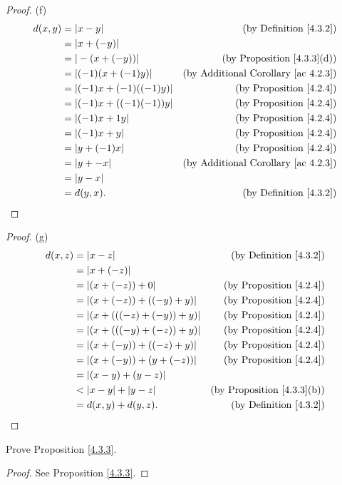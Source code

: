 \begin{proof}{(f)}
\begin{align*}
d(x, y) &= |x - y| & \text{(by Definition \ref{4.3.2})} \\
&= |x + (-y)| \\
&= |-(x + (-y))| & \text{(by Proposition \ref{4.3.3}(d))} \\
&= |(-1)(x + (-1)y)| & \text{(by Additional Corollary \ref{ac 4.2.3})} \\
&= |(-1)x + (-1)((-1)y)| & \text{(by Proposition \ref{4.2.4})} \\
&= |(-1)x + ((-1)(-1))y| & \text{(by Proposition \ref{4.2.4})} \\
&= |(-1)x + 1y| & \text{(by Proposition \ref{4.2.4})} \\
&= |(-1)x + y| & \text{(by Proposition \ref{4.2.4})} \\
&= |y + (-1)x| & \text{(by Proposition \ref{4.2.4})} \\
&= |y + -x| & \text{(by Additional Corollary \ref{ac 4.2.3})} \\
&= |y - x| \\
&= d(y, x). & \text{(by Definition \ref{4.3.2})}
\end{align*}
\end{proof}

\begin{proof}{(g)}
\begin{align*}
d(x, z) &= |x - z| & \text{(by Definition \ref{4.3.2})} \\
&= |x + (-z)| \\
&= |(x + (-z)) + 0| & \text{(by Proposition \ref{4.2.4})} \\
&= |(x + (-z)) + ((-y) + y)| & \text{(by Proposition \ref{4.2.4})} \\
&= |(x + (((-z) + (-y)) + y)| & \text{(by Proposition \ref{4.2.4})} \\
&= |(x + (((-y) + (-z)) + y)| & \text{(by Proposition \ref{4.2.4})} \\
&= |(x + (-y)) + ((-z) + y)| & \text{(by Proposition \ref{4.2.4})} \\
&= |(x + (-y)) + (y + (-z))| & \text{(by Proposition \ref{4.2.4})} \\
&= |(x - y) + (y - z)| \\
&< |x - y| + |y - z| & \text{(by Proposition \ref{4.3.3}(b))} \\
&= d(x, y) + d(y, z). & \text{(by Definition \ref{4.3.2})} \\
\end{align*}
\end{proof}

\exercisesection

\begin{exercise}\label{ex 4.3.1}
Prove Proposition \ref{4.3.3}.
\end{exercise}

\begin{proof}
See Proposition \ref{4.3.3}.
\end{proof}